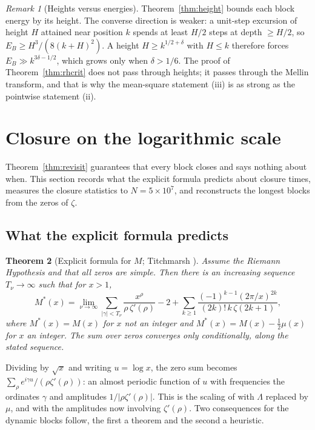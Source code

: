 \documentclass[11pt]{article}
\newtheorem{theorem}{Theorem}[section]
\theoremstyle{definition}
\theoremstyle{remark}
\newtheorem{remark}[theorem]{Remark}
\begin{document}
\begin{remark}[Heights versus energies]
Theorem~\ref{thm:height} bounds each block energy by its height. The converse direction is weaker: a unit-step excursion of height $H$ attained near position $k$ spends at least $H/2$ steps at depth $\ge H/2$, so $E_B\ge H^3/(8(k+H)^2)$. A height $H\ge k^{1/2+\delta}$ with $H\le k$ therefore forces $E_B\gg k^{3\delta-1/2}$, which grows only when $\delta>1/6$. The proof of Theorem~\ref{thm:rhcrit} does not pass through heights; it passes through the Mellin transform, and that is why the mean-square statement (iii) is as strong as the pointwise statement (ii).
\end{remark}

\section{Closure on the logarithmic scale}\label{sec:closure}

Theorem~\ref{thm:revisit} guarantees that every block closes and says nothing about when. This section records what the explicit formula predicts about closure times, measures the closure statistics to $N=5\times10^7$, and reconstructs the longest blocks from the zeros of $\zeta$.

\subsection{What the explicit formula predicts}

\begin{theorem}[Explicit formula for $M$; Titchmarsh {\cite[\S14.27]{titchmarsh}}]\label{thm:explicitM}
Assume the Riemann Hypothesis and that all zeros are simple. Then there is an increasing sequence $T_\nu\to\infty$ such that for $x>1$,
\begin{equation}\label{eq:explicitM}
M^*(x)=\lim_{\nu\to\infty}\sum_{|\gamma|<T_\nu}\frac{x^{\rho}}{\rho\,\zeta'(\rho)}-2+\sum_{k\ge1}\frac{(-1)^{k-1}(2\pi/x)^{2k}}{(2k)!\,k\,\zeta(2k+1)},
\end{equation}
where $M^*(x)=M(x)$ for $x$ not an integer and $M^*(x)=M(x)-\tfrac12\mu(x)$ for $x$ an integer. The sum over zeros converges only conditionally, along the stated sequence.
\end{theorem}

Dividing by $\sqrt x$ and writing $u=\log x$, the zero sum becomes $\sum_\rho e^{i\gamma u}/(\rho\zeta'(\rho))$: an almost periodic function of $u$ with frequencies the ordinates $\gamma$ and amplitudes $1/|\rho\zeta'(\rho)|$. This is the scaling of \cite[Proposition 13.1]{michaels-folds} with $\Lambda$ replaced by $\mu$, and with the amplitudes now involving $\zeta'(\rho)$. Two consequences for the dynamic blocks follow, the first a theorem and the second a heuristic.
\end{document}
